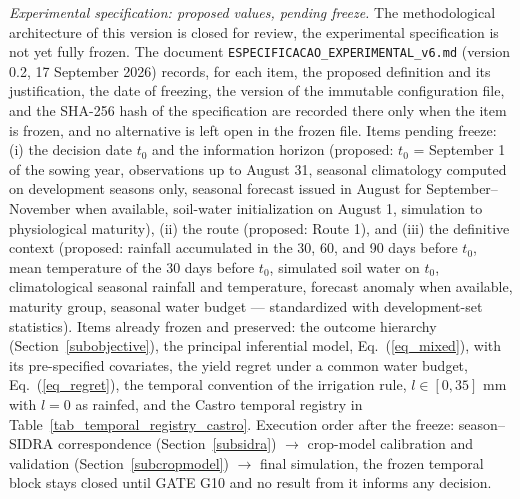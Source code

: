 \documentclass[times,final,authoryear]{elsarticle}
\begin{document}
\emph{Experimental specification: proposed values, pending freeze.} The methodological architecture of this version is closed for review, the experimental specification is not yet fully frozen. The document \texttt{ESPECIFICACAO\_EXPERIMENTAL\_v6.md} (version 0.2, 17 September 2026) records, for each item, the proposed definition and its justification, the date of freezing, the version of the immutable configuration file, and the SHA-256 hash of the specification are recorded there only when the item is frozen, and no alternative is left open in the frozen file. Items pending freeze: (i) the decision date $t_0$ and the information horizon (proposed: $t_0$ = September 1 of the sowing year, observations up to August 31, seasonal climatology computed on development seasons only, seasonal forecast issued in August for September--November when available, soil-water initialization on August 1, simulation to physiological maturity), (ii) the route (proposed: Route 1), and (iii) the definitive context (proposed: rainfall accumulated in the 30, 60, and 90 days before $t_0$, mean temperature of the 30 days before $t_0$, simulated soil water on $t_0$, climatological seasonal rainfall and temperature, forecast anomaly when available, maturity group, seasonal water budget --- standardized with development-set statistics). Items already frozen and preserved: the outcome hierarchy (Section~\ref{subobjective}), the principal inferential model, Eq.~(\ref{eq_mixed}), with its pre-specified covariates, the yield regret under a common water budget, Eq.~(\ref{eq_regret}), the temporal convention of the irrigation rule, $l \in [0, 35]$ mm with $l = 0$ as rainfed, and the Castro temporal registry in Table~\ref{tab_temporal_registry_castro}. Execution order after the freeze: season--SIDRA correspondence (Section~\ref{subsidra}) $\rightarrow$ crop-model calibration and validation (Section~\ref{subcropmodel}) $\rightarrow$ final simulation, the frozen temporal block stays closed until GATE G10 and no result from it informs any decision.
\end{document}
